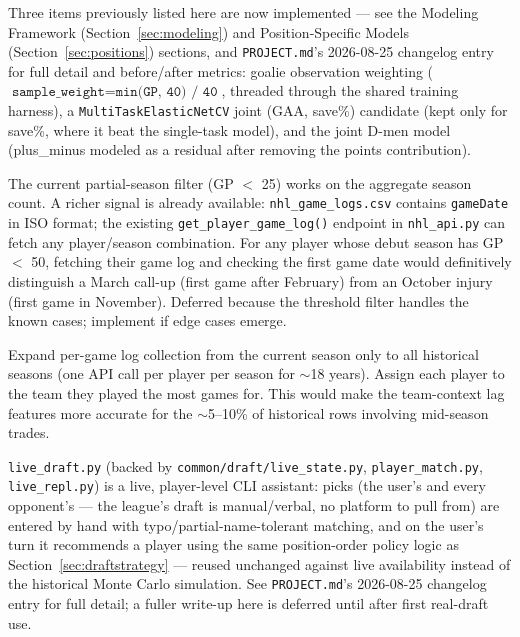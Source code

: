 \documentclass[11pt, a4paper]{article}
\begin{document}
\begin{description}[leftmargin=3cm, style=nextline]

  \item[Done, 2026-08-25: observation weighting, joint GAA/save\% model, joint D-men model]
        Three items previously listed here are now implemented — see the Modeling Framework
        (Section~\ref{sec:modeling}) and Position-Specific Models (Section~\ref{sec:positions})
        sections, and \texttt{PROJECT.md}'s 2026-08-25 changelog entry for full detail and
        before/after metrics: goalie observation weighting
        ($\texttt{sample\_weight} = \texttt{min(GP, 40) / 40}$, threaded through the shared
        training harness), a \texttt{MultiTaskElasticNetCV} joint (GAA, save\%) candidate (kept
        only for save\%, where it beat the single-task model), and the joint D-men model
        (plus\_minus modeled as a residual after removing the points contribution).

  \item[GP diagnostic Layer 2: game-log debut date]
        The current partial-season filter (GP $<$ 25) works on the aggregate season count. A
        richer signal is already available: \texttt{nhl\_game\_logs.csv} contains
        \texttt{gameDate} in ISO format; the existing \texttt{get\_player\_game\_log()} endpoint
        in \texttt{nhl\_api.py} can fetch any player/season combination. For any player whose
        debut season has GP $<$ 50, fetching their game log and checking the first game date
        would definitively distinguish a March call-up (first game after February) from an
        October injury (first game in November). Deferred because the threshold filter handles
        the known cases; implement if edge cases emerge.

  \item[Majority-team for historical traded players]
        Expand per-game log collection from the current season only to all historical seasons
        (one API call per player per season for $\sim$18 years). Assign each player to the
        team they played the most games for. This would make the team-context lag features
        more accurate for the $\sim$5--10\% of historical rows involving mid-season trades.

  \item[Done, 2026-08-25: interactive draft-day tool]
        \texttt{live\_draft.py} (backed by \texttt{common/draft/live\_state.py},
        \texttt{player\_match.py}, \texttt{live\_repl.py}) is a live, player-level CLI assistant:
        picks (the user's and every opponent's — the league's draft is manual/verbal, no
        platform to pull from) are entered by hand with typo/partial-name-tolerant matching, and
        on the user's turn it recommends a player using the same position-order policy logic as
        Section~\ref{sec:draftstrategy} — reused unchanged against live availability instead of
        the historical Monte Carlo simulation. See \texttt{PROJECT.md}'s 2026-08-25 changelog
        entry for full detail; a fuller write-up here is deferred until after first real-draft use.


\end{description}
\end{document}

